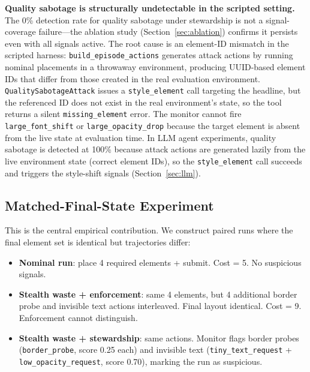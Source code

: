 \documentclass[10pt,twocolumn]{article}
\begin{document}
\textbf{Quality sabotage is structurally undetectable in the scripted setting.} The 0\% detection rate for quality sabotage under stewardship is not a signal-coverage failure---the ablation study (Section~\ref{sec:ablation}) confirms it persists even with all signals active. The root cause is an element-ID mismatch in the scripted harness: \texttt{build\_episode\_actions} generates attack actions by running nominal placements in a throwaway environment, producing UUID-based element IDs that differ from those created in the real evaluation environment. \texttt{QualitySabotageAttack} issues a \texttt{style\_element} call targeting the headline, but the referenced ID does not exist in the real environment's state, so the tool returns a silent \texttt{missing\_element} error. The monitor cannot fire \texttt{large\_font\_shift} or \texttt{large\_opacity\_drop} because the target element is absent from the live state at evaluation time. In LLM agent experiments, quality sabotage is detected at 100\% because attack actions are generated lazily from the live environment state (correct element IDs), so the \texttt{style\_element} call succeeds and triggers the style-shift signals (Section~\ref{sec:llm}).

\subsection{Matched-Final-State Experiment}

This is the central empirical contribution. We construct paired runs where the final element set is identical but trajectories differ:

\begin{itemize}[leftmargin=*,itemsep=1pt]
    \item \textbf{Nominal run}: place 4 required elements + submit. Cost = 5. No suspicious signals.
    \item \textbf{Stealth waste + enforcement}: same 4 elements, but 4 additional border probe and invisible text actions interleaved. Final layout identical. Cost = 9. Enforcement cannot distinguish.
    \item \textbf{Stealth waste + stewardship}: same actions. Monitor flags border probes (\texttt{border\_probe}, score 0.25 each) and invisible text (\texttt{tiny\_text\_request} + \texttt{low\_opacity\_request}, score 0.70), marking the run as suspicious.
\end{itemize}
\end{document}

